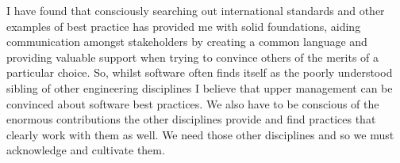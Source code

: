 \documentclass[11pt,twoside]{article}
\begin{document}
I have found that consciously searching out international standards and other examples 
of best practice has provided me with solid foundations, aiding communication 
amongst stakeholders by creating a common language and providing valuable support 
when trying to convince others of the merits of a particular choice. So, whilst software 
often finds itself as the poorly understood sibling of other engineering disciplines I believe 
that upper management can be convinced about software best practices. We also 
have to be conscious of the enormous contributions the other disciplines provide and 
find practices that clearly work with them as well. We need those other disciplines and 
so we must acknowledge and cultivate them. 



\end{document}
